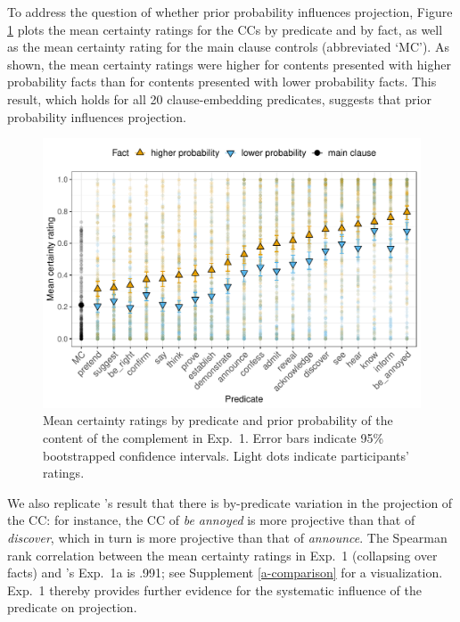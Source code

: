\documentclass[11pt,fleqn]{article}
\newcommand{\6}{\mbox{$[\hspace*{-.6mm}[$}}
\newcommand{\9}{\mbox{$]\hspace*{-.6mm}]$}}
\newcommand{\citepos}[1]{\citeauthor{#1}'s \citeyear{#1}}
\begin{document}
To address the question of whether prior probability influences projection, Figure \ref{f-projection-mean} plots the mean certainty ratings for the CCs by  predicate and by fact, as well as the mean certainty rating for the main clause controls (abbreviated `MC'). As shown, the mean certainty ratings were higher for contents  presented with higher probability facts than for contents presented with lower probability facts. This result, which holds for all 20 clause-embedding predicates, suggests that prior probability influences projection.

\begin{figure}[h!]
\centering

\includegraphics[width=.75\paperwidth]{../../results/9-prior-projection/graphs/means-projectivity-by-predicate-and-prior}

\caption{Mean certainty ratings by predicate and prior probability of the content of the complement in Exp.~1. Error bars indicate 95\% bootstrapped confidence intervals. Light dots indicate participants' ratings.} 
\label{f-projection-mean}
\end{figure}
We also replicate \citepos{tonhauser-degen-factive} result that there is by-predicate variation in the projection of the CC: for instance, the CC of {\em be annoyed} is more projective than that of {\em discover}, which in turn is more projective than that of {\em announce}. The Spearman rank correlation between the mean certainty ratings in Exp.~1 (collapsing over facts) and \citepos{tonhauser-degen-factive} Exp.~1a is .991; see Supplement \ref{a-comparison} for a visualization. Exp.~1 thereby provides further evidence for the systematic influence of the predicate on projection.
\end{document}
